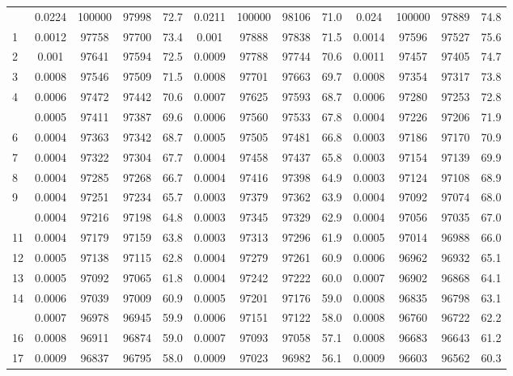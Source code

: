 \documentclass[
  14pt,
]{article}
\begin{document}
\begin{longtable}[t]{lcccccccccccc}
\endfoot
\bottomrule
\endlastfoot
0 & 0.0224 & 100000 & 97998 & 72.7 & 0.0211 & 100000 & 98106 & 71.0 & 0.024 & 100000 & 97889 & 74.8\\
1 & 0.0012 & 97758 & 97700 & 73.4 & 0.001 & 97888 & 97838 & 71.5 & 0.0014 & 97596 & 97527 & 75.6\\
2 & 0.001 & 97641 & 97594 & 72.5 & 0.0009 & 97788 & 97744 & 70.6 & 0.0011 & 97457 & 97405 & 74.7\\
3 & 0.0008 & 97546 & 97509 & 71.5 & 0.0008 & 97701 & 97663 & 69.7 & 0.0008 & 97354 & 97317 & 73.8\\
4 & 0.0006 & 97472 & 97442 & 70.6 & 0.0007 & 97625 & 97593 & 68.7 & 0.0006 & 97280 & 97253 & 72.8\\
\addlinespace
5 & 0.0005 & 97411 & 97387 & 69.6 & 0.0006 & 97560 & 97533 & 67.8 & 0.0004 & 97226 & 97206 & 71.9\\
6 & 0.0004 & 97363 & 97342 & 68.7 & 0.0005 & 97505 & 97481 & 66.8 & 0.0003 & 97186 & 97170 & 70.9\\
7 & 0.0004 & 97322 & 97304 & 67.7 & 0.0004 & 97458 & 97437 & 65.8 & 0.0003 & 97154 & 97139 & 69.9\\
8 & 0.0004 & 97285 & 97268 & 66.7 & 0.0004 & 97416 & 97398 & 64.9 & 0.0003 & 97124 & 97108 & 68.9\\
9 & 0.0004 & 97251 & 97234 & 65.7 & 0.0003 & 97379 & 97362 & 63.9 & 0.0004 & 97092 & 97074 & 68.0\\
\addlinespace
10 & 0.0004 & 97216 & 97198 & 64.8 & 0.0003 & 97345 & 97329 & 62.9 & 0.0004 & 97056 & 97035 & 67.0\\
11 & 0.0004 & 97179 & 97159 & 63.8 & 0.0003 & 97313 & 97296 & 61.9 & 0.0005 & 97014 & 96988 & 66.0\\
12 & 0.0005 & 97138 & 97115 & 62.8 & 0.0004 & 97279 & 97261 & 60.9 & 0.0006 & 96962 & 96932 & 65.1\\
13 & 0.0005 & 97092 & 97065 & 61.8 & 0.0004 & 97242 & 97222 & 60.0 & 0.0007 & 96902 & 96868 & 64.1\\
14 & 0.0006 & 97039 & 97009 & 60.9 & 0.0005 & 97201 & 97176 & 59.0 & 0.0008 & 96835 & 96798 & 63.1\\
\addlinespace
15 & 0.0007 & 96978 & 96945 & 59.9 & 0.0006 & 97151 & 97122 & 58.0 & 0.0008 & 96760 & 96722 & 62.2\\
16 & 0.0008 & 96911 & 96874 & 59.0 & 0.0007 & 97093 & 97058 & 57.1 & 0.0008 & 96683 & 96643 & 61.2\\
17 & 0.0009 & 96837 & 96795 & 58.0 & 0.0009 & 97023 & 96982 & 56.1 & 0.0009 & 96603 & 96562 & 60.3\\

\end{longtable}
\end{document}
